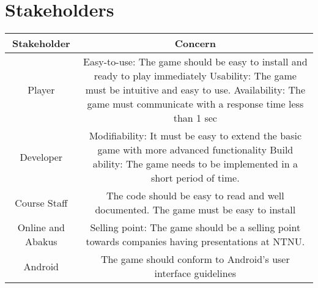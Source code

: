 \section{Stakeholders} 
\label{sec:stakeholders}

\begin{tabular}{|c|c|}
\hline
Stakeholder & Concern \\ \hline
Player & Easy-to-use: The game should be easy to install and ready to play immediately \newline
Usability: The game must be intuitive and easy to use. \newline
Availability: The game must communicate with a response time less than 1 sec\\ \hline 
Developer & Modifiability: It must be easy to extend the basic game with more advanced functionality \newline
Build ability: The game needs to be implemented in a short period of time.\\ \hline
Course Staff & The code should be easy to read and well documented. The game must be easy to install \\ \hline
Online and Abakus & Selling point: The game should be a selling point towards companies having presentations at NTNU. \\ \hline
Android & The game should conform to Android's user interface guidelines \cite{website:Android} %
\end{tabular}

